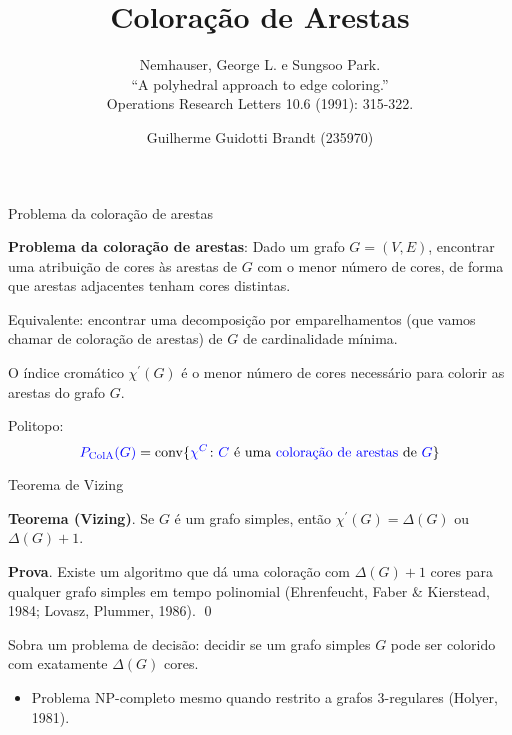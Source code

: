 \documentclass{beamer}
\title{Coloração de Arestas}
\subtitle{
    Nemhauser, George L. e Sungsoo Park.\\
    ``A polyhedral approach to edge coloring.''\\
    Operations Research Letters 10.6 (1991): 315-322.}
\author{Guilherme Guidotti Brandt (235970)}
\institute{IC - Unicamp}
\date{}
\DeclareMathOperator{\conv}{\mathrm{conv}}
\begin{document}
    \frame{\titlepage}

    \begin{frame}{Problema da coloração de arestas}

        {\bf Problema da coloração de arestas}: Dado um grafo {\color{blue}$G = (V, E)$}, encontrar uma atribuição de cores às arestas de {\color{blue}$G$} com o menor número de cores, de forma que arestas adjacentes tenham cores distintas.

        \pause
        \vspace{.5cm}
        Equivalente: encontrar uma decomposição por emparelhamentos (que vamos chamar de {\color{blue} coloração de arestas}) de {\color{blue}$G$} de cardinalidade mínima.
        
        \vspace{.5cm}
        \pause
        O {\color{blue} índice cromático $\chi^\prime(G)$} é o menor número de cores necessário para colorir as arestas do grafo {\color{blue} $G$}.

        \vspace{.5cm}
        \pause
        Politopo:
        $${\color{blue} P_\mathrm{ColA}(G)} = \conv \{{\color{blue} \chi^C} \colon {\color{blue} C} \text{ é uma {\color{blue} coloração de arestas} de } {\color{blue} G} \}$$
    \end{frame}

    \begin{frame}{Teorema de Vizing}

        {\color{blue} \bf Teorema (Vizing)}. Se $G$ é um grafo simples, então {\color{blue} $\chi^\prime(G) = \Delta(G)$} ou {\color{blue} $\Delta(G) + 1$}.
        \pause

        \vspace{.5cm}
        {\color{blue} {\bf Prova}}. Existe um algoritmo que dá uma coloração com {\color{blue} $\Delta(G) + 1$} cores para qualquer grafo simples  em tempo polinomial {\color{blue} (Ehrenfeucht, Faber \& Kierstead, 1984; Lovasz, Plummer, 1986)}. \qed
        \pause

        \vspace{.5cm}
        Sobra um problema de decisão: decidir se um grafo simples {\color{blue} $G$} pode ser colorido com exatamente {\color{blue} $\Delta(G)$} cores.
        \begin{itemize}
            \item Problema NP-completo mesmo quando restrito a grafos 3-regulares {\color{blue} (Holyer, 1981)}.
        \end{itemize}
    \end{frame}
\end{document}
